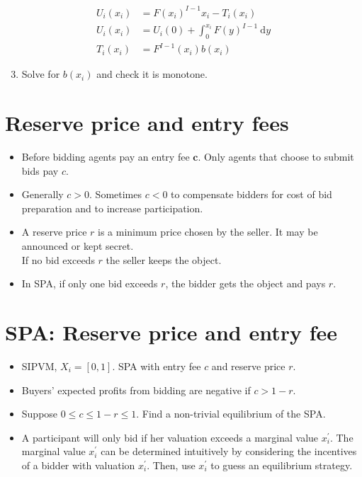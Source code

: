\documentclass[10pt]{article}
\begin{document}
$$
\begin{aligned}
U_{i}\left(x_{i}\right) & =F\left(x_{i}\right)^{I-1} x_{i}-T_{i}\left(x_{i}\right) \\
U_{i}\left(x_{i}\right) & =U_{i}(0)+\int_{0}^{x_{i}} F(y)^{I-1} \mathrm{~d} y \\
T_{i}\left(x_{i}\right) & =F^{I-1}\left(x_{i}\right) b\left(x_{i}\right)
\end{aligned}
$$

\begin{enumerate}
  \setcounter{enumi}{2}
  \item Solve for $b\left(x_{i}\right)$ and check it is monotone.
\end{enumerate}

\section*{Reserve price and entry fees}
\begin{itemize}
  \item Before bidding agents pay an entry fee $\boldsymbol{c}$. Only agents that choose to submit bids pay $c$.
  \item Generally $c>0$. Sometimes $c<0$ to compensate bidders for cost of bid preparation and to increase participation.
  \item A reserve price $r$ is a minimum price chosen by the seller. It may be announced or kept secret.\\
If no bid exceeds $r$ the seller keeps the object.
  \item In SPA, if only one bid exceeds $r$, the bidder gets the object and pays $r$.
\end{itemize}

\section*{SPA: Reserve price and entry fee}
\begin{itemize}
  \item SIPVM, $X_{i}=[0,1]$. SPA with entry fee $c$ and reserve price $r$.
  \item Buyers' expected profits from bidding are negative if $c>1-r$.
  \item Suppose $0 \leq c \leq 1-r \leq 1$. Find a non-trivial equilibrium of the SPA.
  \item A participant will only bid if her valuation exceeds a marginal value $x_{i}^{\prime}$. The marginal value $x_{i}^{\prime}$ can be determined intuitively by considering the incentives of a bidder with valuation $x_{i}^{\prime}$. Then, use $x_{i}^{\prime}$ to guess an equilibrium strategy.
\end{itemize}
\end{document}
